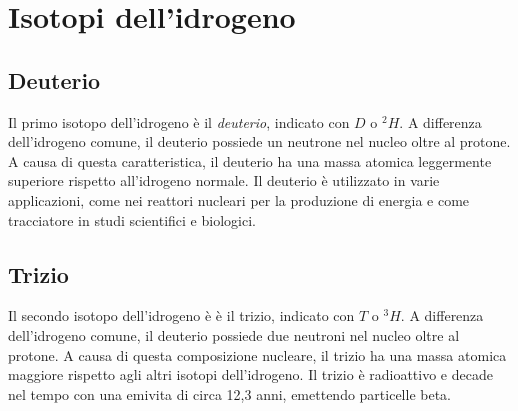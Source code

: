\documentclass[a4paper]{article}
\begin{document}


\pagebreak

\section{Isotopi dell'idrogeno}

\subsection{Deuterio}

Il primo isotopo dell'idrogeno è il \textit{deuterio}, indicato con \(D\) o \(^2H\).
A differenza dell'idrogeno comune, il deuterio possiede un neutrone nel nucleo oltre al protone.
A causa di questa caratteristica, il deuterio ha una massa atomica leggermente superiore rispetto all'idrogeno normale.
Il deuterio è utilizzato in varie applicazioni, come nei reattori nucleari per la produzione di energia e come tracciatore in studi scientifici e biologici. 

\subsection{Trizio}

Il secondo isotopo dell'idrogeno è è il trizio, indicato con \(T\) o \(^3H\).
A differenza dell'idrogeno comune, il deuterio possiede due neutroni nel nucleo oltre al protone.
A causa di questa composizione nucleare, il trizio ha una massa atomica maggiore rispetto agli altri isotopi dell'idrogeno.
Il trizio è radioattivo e decade nel tempo con una emivita di circa 12,3 anni, emettendo particelle beta.
\end{document}
